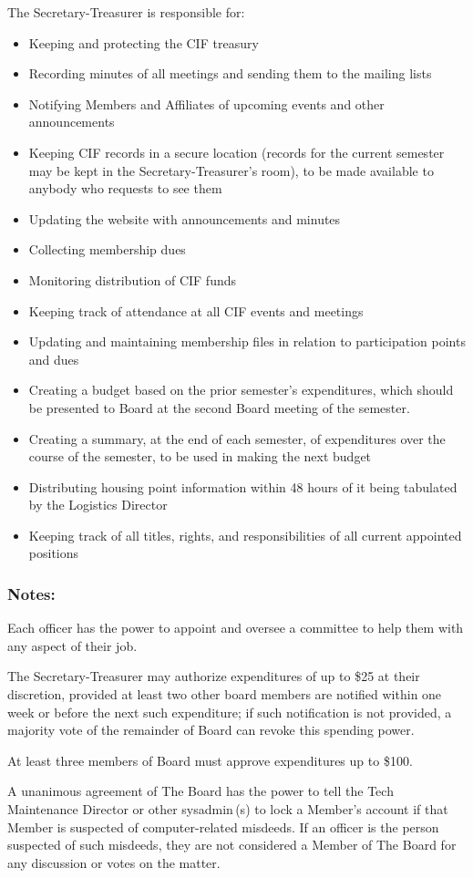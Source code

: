 The Secretary-Treasurer is responsible for:
\begin{itemize}
	\item Keeping and protecting the CIF treasury
	\item Recording minutes of all meetings and sending them to the mailing lists
	\item Notifying Members and Affiliates of upcoming events and other announcements
	\item Keeping CIF records in a secure location (records for the current semester may be kept in the Secretary-Treasurer's room), to be made available to anybody who requests to see them
	\item Updating the website with announcements and minutes
	\item Collecting membership dues
	\item Monitoring distribution of CIF funds
	\item Keeping track of attendance at all CIF events and meetings
	\item Updating and maintaining membership files in relation to participation points and dues
	\item Creating a budget based on the prior semester's expenditures, which should be presented to Board at the second Board meeting of the semester.
	\item Creating a summary, at the end of each semester, of expenditures over the course of the semester, to be used in making the next budget
	\item Distributing housing point information within 48 hours of it being tabulated by the Logistics Director
	\item Keeping track of all titles, rights, and responsibilities of all current appointed positions
\end{itemize}



		\subsubsection{Notes:}

Each officer has the power to appoint and oversee a committee to help them with any aspect of their job.

The Secretary-Treasurer may authorize expenditures of up to \$25 at their discretion, provided at least two other board members are notified within one week or before the next such expenditure; if such notification is not provided, a majority vote of the remainder of Board can revoke this spending power.

At least three members of Board must approve expenditures up to \$100.

A unanimous agreement of The Board has the power to tell the Tech Maintenance Director or other sysadmin\,(s) to lock a Member’s account if that Member is suspected of computer-related misdeeds. If an officer is the person suspected of such misdeeds, they are not considered a Member of The Board for any discussion or votes on the matter.
